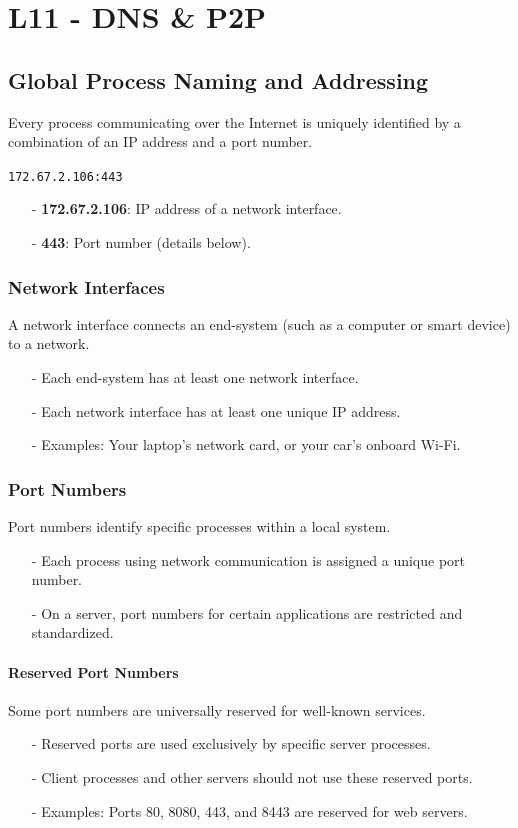 \documentclass[../../compsys.tex]{subfiles}
\begin{document}
\chapter{L11 - DNS \& P2P}
\vfill

\section{Global Process Naming and Addressing}
Every process communicating over the Internet is uniquely identified by a combination of an IP address and a port number.
\begin{center}
    \texttt{172.67.2.106:443}
\end{center}
\begin{itemize}
    \item[-] \textbf{172.67.2.106}: IP address of a network interface.
    \item[-] \textbf{443}: Port number (details below).
\end{itemize}
\subsection{Network Interfaces}
A network interface connects an end-system (such as a computer or smart device) to a network.  
\begin{itemize}
    \item[-] Each end-system has at least one network interface.
    \item[-] Each network interface has at least one unique IP address.
    \item[-] Examples: Your laptop's network card, or your car's onboard Wi-Fi.
\end{itemize}

\newpage
\subsection{Port Numbers}
Port numbers identify specific processes within a local system.
\begin{itemize}
    \item[-] Each process using network communication is assigned a unique port number.
    \item[-] On a server, port numbers for certain applications are restricted and standardized.
\end{itemize}

\subsubsection{Reserved Port Numbers}
Some port numbers are universally reserved for well-known services.
\begin{itemize}
    \item[-] Reserved ports are used exclusively by specific server processes.
    \item[-] Client processes and other servers should not use these reserved ports.
    \item[-] Examples: Ports 80, 8080, 443, and 8443 are reserved for web servers.
\end{itemize}
\end{document}
